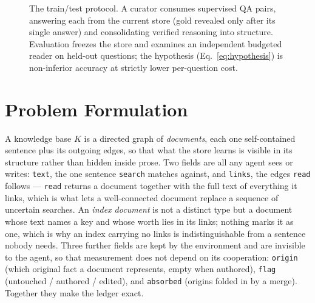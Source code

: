 \documentclass[conference]{IEEEtran}
\begin{document}
\begin{figure}[t]

\caption{The train/test protocol. A curator consumes supervised QA pairs,
answering each from the current store (gold revealed only after its single answer)
and consolidating verified reasoning into structure. Evaluation freezes the store and
examines an independent budgeted reader on held-out questions; the hypothesis
(Eq.~\ref{eq:hypothesis}) is non-inferior accuracy at strictly lower per-question
cost.}
\label{fig:protocol}
\end{figure}

\section{Problem Formulation}
A knowledge base $K$ is a directed graph of \emph{documents}, each one
self-contained sentence plus its outgoing edges, so that what the store
learns is visible in its structure rather than hidden inside prose. Two
fields are all any agent sees or writes: \texttt{text}, the one sentence
\texttt{search} matches against, and \texttt{links}, the edges
\texttt{read} follows --- \texttt{read} returns a document together with the
full text of everything it links, which is what lets a well-connected
document replace a sequence of uncertain searches. An \emph{index document}
is not a distinct type but a document whose text names a key and whose worth
lies in its links; nothing marks it as one, which is why an index carrying no
links is indistinguishable from a sentence nobody needs. Three further
fields are kept by the environment and are invisible to the agent, so that
measurement does not depend on its cooperation: \texttt{origin} (which
original fact a document represents, empty when authored), \texttt{flag}
(untouched / authored / edited), and \texttt{absorbed} (origins folded in by
a merge). Together they make the ledger exact.
\end{document}
